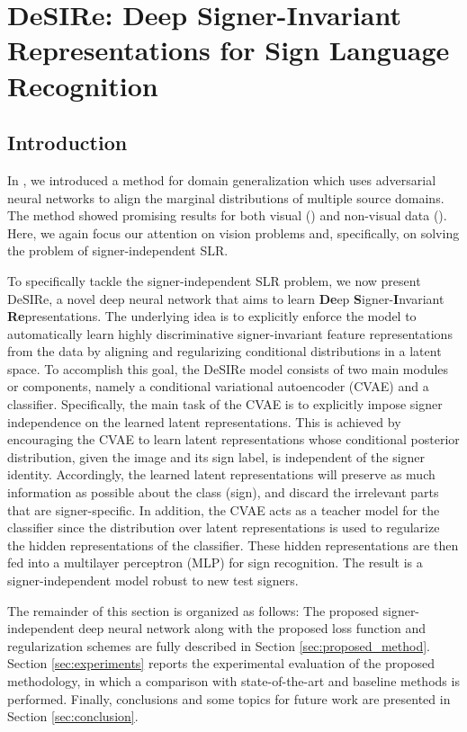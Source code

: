 \section{DeSIRe: Deep Signer-Invariant Representations for Sign Language Recognition}
\label{sec:desire}

\subsection{Introduction}
In , we introduced a method for domain generalization which uses adversarial neural networks to align the marginal distributions of multiple source domains. The method showed promising results for both visual () and non-visual data (). Here, we again focus our attention on vision problems and, specifically, on solving the problem of signer-independent SLR.

To specifically tackle the signer-independent SLR problem, we now present DeSIRe, a novel deep neural network that aims to learn \textbf{De}ep \textbf{S}igner-\textbf{I}nvariant \textbf{Re}presentations. The underlying idea is to explicitly enforce the model to automatically learn highly discriminative signer-invariant feature representations from the data by aligning and regularizing conditional distributions in a latent space. To accomplish this goal, the DeSIRe model consists of two main modules or components, namely a conditional variational autoencoder (CVAE) and a classifier. Specifically, the main task of the CVAE is to explicitly impose signer independence on the learned latent representations. This is achieved by encouraging the CVAE to learn latent representations whose conditional posterior distribution, given the image and its sign label, is independent of the signer identity. Accordingly, the learned latent representations will preserve as much information as possible about the class (sign), and discard the irrelevant parts that are signer-specific. In addition, the CVAE acts as a teacher model for the classifier since the distribution over latent representations is used to regularize the hidden representations of the classifier. These hidden representations are then fed into a multilayer perceptron (MLP) for sign recognition. The result is a signer-independent model robust to new test signers.

The remainder of this section is organized as follows: The proposed signer-independent deep neural network along with the proposed loss function and regularization schemes are fully described in Section \ref{sec:proposed_method}. Section \ref{sec:experiments} reports the experimental evaluation of the proposed methodology, in which a comparison with state-of-the-art and baseline methods is performed. Finally, conclusions and some topics for future work are presented in Section \ref{sec:conclusion}.

